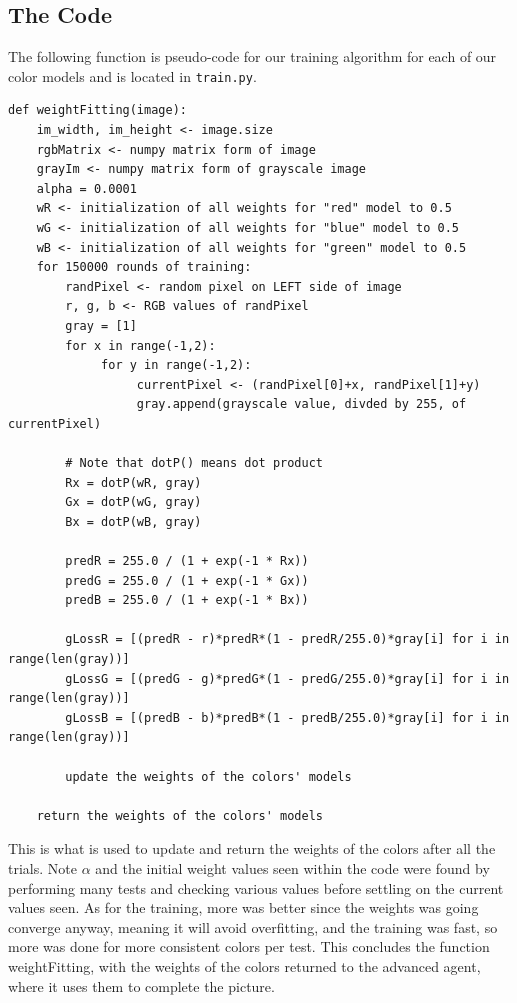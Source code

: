 \documentclass[11pt]{article}
\begin{document}
\subsection{The Code}
The following function is pseudo-code for our training algorithm for each of our color models and is located in \verb|train.py|.
\begin{verbatim}
def weightFitting(image):
    im_width, im_height <- image.size
    rgbMatrix <- numpy matrix form of image
    grayIm <- numpy matrix form of grayscale image
    alpha = 0.0001
    wR <- initialization of all weights for "red" model to 0.5
    wG <- initialization of all weights for "blue" model to 0.5
    wB <- initialization of all weights for "green" model to 0.5
    for 150000 rounds of training:
        randPixel <- random pixel on LEFT side of image
        r, g, b <- RGB values of randPixel
        gray = [1]
        for x in range(-1,2):
             for y in range(-1,2):
                  currentPixel <- (randPixel[0]+x, randPixel[1]+y) 
                  gray.append(grayscale value, divded by 255, of currentPixel)
                  
        # Note that dotP() means dot product
        Rx = dotP(wR, gray)
        Gx = dotP(wG, gray)
        Bx = dotP(wB, gray)

        predR = 255.0 / (1 + exp(-1 * Rx))
        predG = 255.0 / (1 + exp(-1 * Gx))
        predB = 255.0 / (1 + exp(-1 * Bx))

        gLossR = [(predR - r)*predR*(1 - predR/255.0)*gray[i] for i in range(len(gray))]
        gLossG = [(predG - g)*predG*(1 - predG/255.0)*gray[i] for i in range(len(gray))]
        gLossB = [(predB - b)*predB*(1 - predB/255.0)*gray[i] for i in range(len(gray))]

        update the weights of the colors' models
        
    return the weights of the colors' models
\end{verbatim}
This is what is used to update and return the weights of the colors after all the trials. Note $\alpha$ and the initial weight values seen within the code were found by performing many tests and checking various values before settling on the current values seen. As for the training, more was better since the weights was going converge anyway, meaning it will avoid overfitting, and the training was fast, so more was done for more consistent colors per test. This concludes the function weightFitting, with the weights of the colors returned to the advanced agent, where it uses them to complete the picture.
\end{document}
